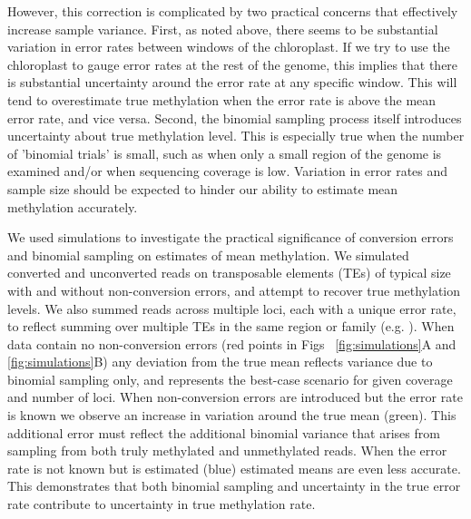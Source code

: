 \documentclass[10pt,draft,letterpaper]{article}
\begin{document}
However, this correction is complicated by two practical concerns that effectively increase sample variance.
First, as noted above, there seems to be substantial variation in error rates between windows of the chloroplast.
If we try to use the chloroplast to gauge error rates at the rest of the genome, this implies that there is substantial uncertainty around the error rate at any specific window.
This will tend to overestimate true methylation when the error rate is above the mean error rate, and vice versa.
Second, the binomial sampling process itself introduces uncertainty about true methylation level.
This is especially true when the number of 'binomial trials' is small, such as when only a small region of the genome is examined and/or when sequencing coverage is low.
Variation in error rates and sample size should be expected to hinder our ability to estimate mean methylation accurately.

We used simulations to investigate the practical significance of conversion errors and binomial sampling on estimates of mean methylation.
We simulated converted and unconverted reads on transposable elements (TEs) of typical size with and without non-conversion errors, and attempt to recover true methylation levels.
We also summed reads across multiple loci, each with a unique error rate, to reflect summing over multiple TEs in the same region or family (e.g. \cite{sasaki2019common}).
When data contain no non-conversion errors (red points in Figs ~\ref{fig:simulations}A and \ref{fig:simulations}B) any deviation from the true mean reflects variance due to binomial sampling only, and represents the best-case scenario for given coverage and number of loci.
When non-conversion errors are introduced but the error rate is known we observe an increase in variation around the true mean (green).
This additional error must reflect the additional binomial variance that arises from sampling from both truly methylated and unmethylated reads.
When the error rate is not known but is estimated (blue) estimated means are even less accurate.
This demonstrates that both binomial sampling and uncertainty in the true error rate contribute to uncertainty in true methylation rate.
\end{document}
